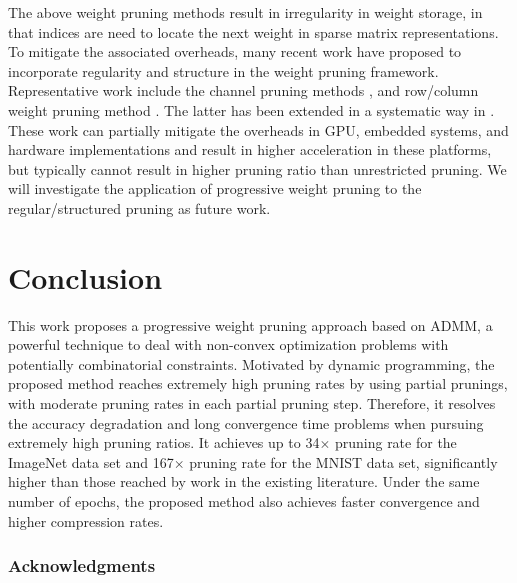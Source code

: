 \documentclass{article} %
\begin{document}
The above weight pruning methods result in irregularity in weight storage, in that indices are need to locate the next weight in sparse matrix representations. To mitigate the associated overheads, many recent work have proposed to incorporate regularity and structure in the weight pruning framework. Representative work include the channel pruning methods \citep{he2017channel,mao2017exploring}, and row/column weight pruning method \citep{wen2016learning}. The latter has been extended in a systematic way in \citet{zhang2018adam}. These work can partially mitigate the overheads in GPU, embedded systems, and hardware implementations and result in higher acceleration in these platforms, but typically cannot result in higher pruning ratio than unrestricted pruning. We will investigate the application of progressive weight pruning to the regular/structured pruning as future work.



\section{Conclusion}
This work proposes a progressive weight pruning approach based on ADMM, a powerful technique to deal with non-convex optimization problems with potentially combinatorial constraints.
Motivated by dynamic programming, the proposed method reaches extremely high pruning rates by using partial prunings, with moderate pruning rates in each partial pruning step.
Therefore, it resolves the accuracy degradation and long convergence time problems when pursuing extremely high pruning ratios.
It achieves up to 34$\times$ pruning rate for the ImageNet data set and 167$\times$ pruning rate for the MNIST data set, significantly higher than those reached by work in the existing literature.
Under the same number of epochs, the proposed method also achieves faster convergence and higher compression rates.



























\subsubsection*{Acknowledgments}
\end{document}
